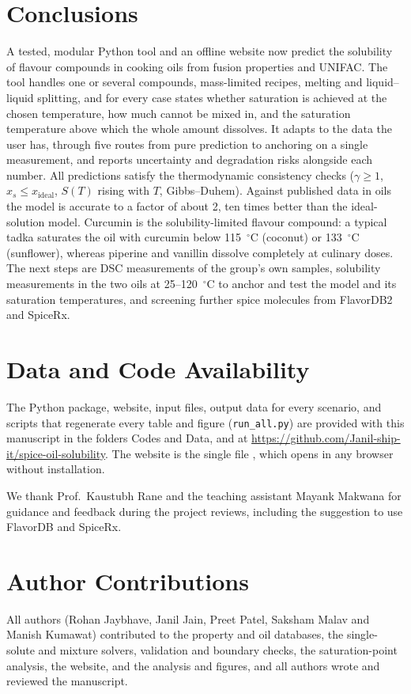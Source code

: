 \documentclass[journal=jceaax,manuscript=article,layout=twocolumn]{achemso}
\begin{document}
\section{Conclusions}
A tested, modular Python tool and an offline website now predict the solubility of flavour compounds in cooking oils from fusion properties and UNIFAC. The tool handles one or several compounds, mass-limited recipes, melting and liquid--liquid splitting, and for every case states whether saturation is achieved at the chosen temperature, how much cannot be mixed in, and the saturation temperature above which the whole amount dissolves. It adapts to the data the user has, through five routes from pure prediction to anchoring on a single measurement, and reports uncertainty and degradation risks alongside each number. All predictions satisfy the thermodynamic consistency checks ($\gamma\ge1$, $x_s\le x_\mathrm{ideal}$, $S(T)$ rising with $T$, Gibbs--Duhem). Against published data in oils the model is accurate to a factor of about 2, ten times better than the ideal-solution model. Curcumin is the solubility-limited flavour compound: a typical tadka saturates the oil with curcumin below 115~$^\circ$C (coconut) or 133~$^\circ$C (sunflower), whereas piperine and vanillin dissolve completely at culinary doses. The next steps are DSC measurements of the group's own samples, solubility measurements in the two oils at 25--120~$^\circ$C to anchor and test the model and its saturation temperatures, and screening further spice molecules from FlavorDB2 and SpiceRx.

\section*{Data and Code Availability}
The Python package, website, input files, output data for every scenario, and scripts that regenerate every table and figure (\texttt{run\_all.py}) are provided with this manuscript in the folders Codes and Data, and at \url{https://github.com/Janil-ship-it/spice-oil-solubility}. The website is the single file , which opens in any browser without installation.

\begin{acknowledgement}
We thank Prof.\ Kaustubh Rane and the teaching assistant Mayank Makwana for guidance and feedback during the project reviews, including the suggestion to use FlavorDB and SpiceRx.
\end{acknowledgement}

\section*{Author Contributions}
All authors (Rohan Jaybhave, Janil Jain, Preet Patel, Saksham Malav and Manish Kumawat) contributed to the property and oil databases, the single-solute and mixture solvers, validation and boundary checks, the saturation-point analysis, the website, and the analysis and figures, and all authors wrote and reviewed the manuscript.
\end{document}
